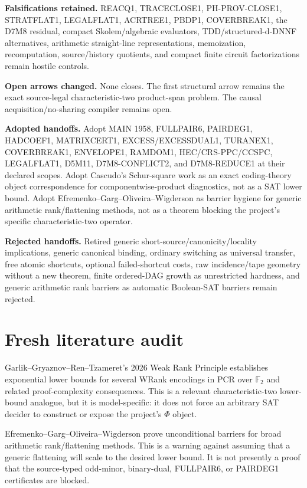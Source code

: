\documentclass[11pt]{article}
\begin{document}
\textbf{Falsifications retained.}
REACQ1, TRACECLOSE1, PH-PROV-CLOSE1, STRATFLAT1, LEGALFLAT1, ACRTREE1, PBDP1, COVERBREAK1, the D7M8 residual, compact Skolem/algebraic evaluators, TDD/structured-d-DNNF alternatives, arithmetic straight-line representations, memoization, recomputation, source/history quotients, and compact finite circuit factorizations remain hostile controls.

\textbf{Open arrows changed.}
None closes. The first structural arrow remains the exact source-legal characteristic-two product-span problem. The causal acquisition/no-sharing compiler remains open.

\textbf{Adopted handoffs.}
Adopt MAIN 1958, FULLPAIR6, PAIRDEG1, HADCOEF1, MATRIXCERT1, EXCESS/EXCESSDUAL1, TURANEX1, COVERBREAK1, ENVELOPE1, RAMDOM1, HEC/CRS-PPC/CCSPC, LEGALFLAT1, D5M11, D7M8-CONFLICT2, and D7M8-REDUCE1 at their declared scopes. Adopt Cascudo's Schur-square work as an exact coding-theory object correspondence for componentwise-product diagnostics, not as a SAT lower bound. Adopt Efremenko--Garg--Oliveira--Wigderson as barrier hygiene for generic arithmetic rank/flattening methods, not as a theorem blocking the project's specific characteristic-two operator.

\textbf{Rejected handoffs.}
Retired generic short-source/canonicity/locality implications, generic canonical binding, ordinary switching as universal transfer, free atomic shortcuts, optional failed-shortcut costs, raw incidence/tape geometry without a new theorem, finite ordered-DAG growth as unrestricted hardness, and generic arithmetic rank barriers as automatic Boolean-SAT barriers remain rejected.

\section*{Fresh literature audit}
Garlik--Gryaznov--Ren--Tzameret's 2026 Weak Rank Principle establishes exponential lower bounds for several WRank encodings in PCR over \(\mathbb F_2\) and related proof-complexity consequences. This is a relevant characteristic-two lower-bound analogue, but it is model-specific: it does not force an arbitrary SAT decider to construct or expose the project's \(\Phi\) object.

Efremenko--Garg--Oliveira--Wigderson prove unconditional barriers for broad arithmetic rank/flattening methods. This is a warning against assuming that a generic flattening will scale to the desired lower bound. It is not presently a proof that the source-typed odd-minor, binary-dual, FULLPAIR6, or PAIRDEG1 certificates are blocked.
\end{document}
